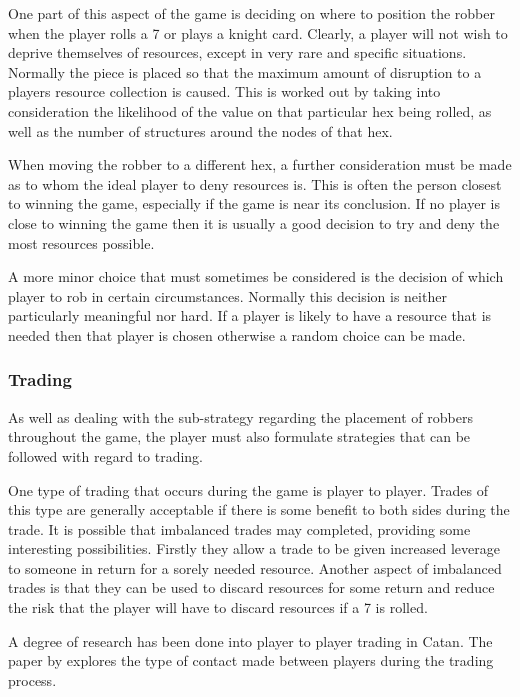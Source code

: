 \documentclass[]{article}
\begin{document}
\par One part of this aspect of the game is deciding on where to position the robber when the player rolls a 7 or plays a knight card. Clearly, a player will not wish to deprive themselves of resources, except in very rare and specific situations. Normally the piece is placed so that the maximum amount of disruption to a players resource collection is caused. This is worked out by taking into consideration the likelihood of the value on that particular hex being rolled, as well as the number of structures around the nodes of that hex.

\par When moving the robber to a different hex, a further consideration must be made as to whom the ideal player to deny resources is. This is often the person closest to winning the game, especially if the game is near its conclusion. If no player is close to winning the game then it is usually a good decision to try and deny the most resources possible.

\par A more minor choice that must sometimes be considered is the decision of which player to rob in certain circumstances. Normally this decision is neither particularly meaningful nor hard. If a player is likely to have a resource that is needed then that player is chosen otherwise a random choice can be made.

\subsubsection{Trading}
As well as dealing with the sub-strategy regarding the placement of robbers throughout the game, the player must also formulate strategies that can be followed with regard to trading.

\par One type of trading that occurs during the game is player to player. Trades of this type are generally acceptable if there is some benefit to both sides during the trade. It is possible that imbalanced trades may completed, providing some interesting possibilities. Firstly they allow a trade to be given increased leverage to someone in return for a sorely needed resource. Another aspect of imbalanced trades is that they can be used to discard resources for some return and reduce the risk that the player will have to discard resources if a 7 is rolled.

\par A degree of research has been done into player to player trading in Catan. The paper by \textcite{afantenos2012developing} explores the type of contact made between players during the trading process.
\end{document}
